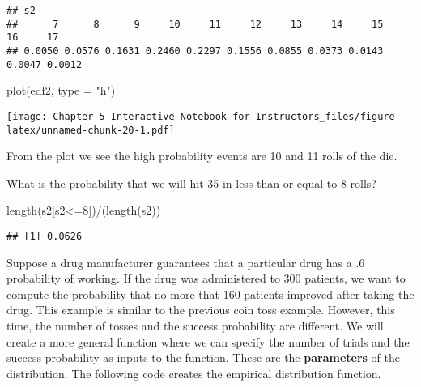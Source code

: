 \documentclass[
]{article}
\newenvironment{Shaded}{\begin{snugshade}}{\end{snugshade}}
\newcommand{\AttributeTok}[1]{\textcolor[rgb]{0.77,0.63,0.00}{#1}}
\newcommand{\DecValTok}[1]{\textcolor[rgb]{0.00,0.00,0.81}{#1}}
\newcommand{\FunctionTok}[1]{\textcolor[rgb]{0.00,0.00,0.00}{#1}}
\newcommand{\NormalTok}[1]{#1}
\newcommand{\SpecialCharTok}[1]{\textcolor[rgb]{0.00,0.00,0.00}{#1}}
\newcommand{\StringTok}[1]{\textcolor[rgb]{0.31,0.60,0.02}{#1}}
\begin{document}
\begin{verbatim}
## s2
##      7      8      9     10     11     12     13     14     15     16     17 
## 0.0050 0.0576 0.1631 0.2460 0.2297 0.1556 0.0855 0.0373 0.0143 0.0047 0.0012
\end{verbatim}

\begin{Shaded}
\begin{Highlighting}[]
\FunctionTok{plot}\NormalTok{(edf2, }\AttributeTok{type =} \StringTok{"h"}\NormalTok{)}
\end{Highlighting}
\end{Shaded}

\texttt{[image: Chapter-5-Interactive-Notebook-for-Instructors\_files/figure-latex/unnamed-chunk-20-1.pdf]}

From the plot we see the high probability events are 10 and 11 rolls of
the die.

What is the probability that we will hit 35 in less than or equal to 8
rolls?

\begin{Shaded}
\begin{Highlighting}[]
\FunctionTok{length}\NormalTok{(s2[s2}\SpecialCharTok{\textless{}=}\DecValTok{8}\NormalTok{])}\SpecialCharTok{/}\NormalTok{(}\FunctionTok{length}\NormalTok{(s2))}
\end{Highlighting}
\end{Shaded}

\begin{verbatim}
## [1] 0.0626
\end{verbatim}

Suppose a drug manufacturer guarantees that a particular drug has a .6
probability of working. If the drug was administered to 300 patients, we
want to compute the probability that no more that 160 patients improved
after taking the drug. This example is similar to the previous coin toss
example. However, this time, the number of tosses and the success
probability are different. We will create a more general function where
we can specify the number of trials and the success probability as
inputs to the function. These are the \textbf{parameters} of the
distribution. The following code creates the empirical distribution
function.
\end{document}
